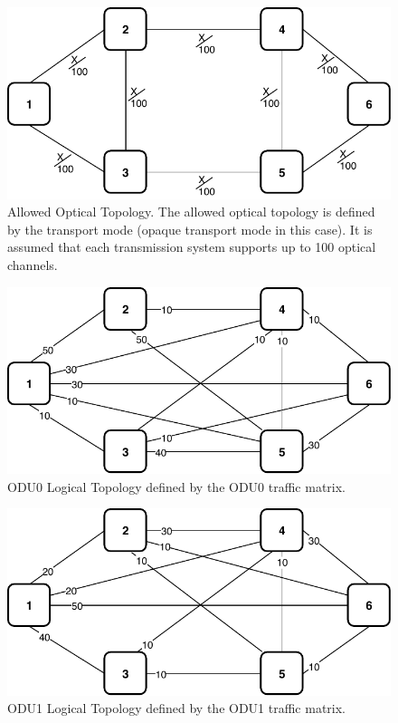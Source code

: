 \begin{figure}[h!]
\centering
\includegraphics[width=13cm]{sdf/ilp/opaque_protection/figures/allowed_optical_topology}
\caption{Allowed Optical Topology. The allowed optical topology is defined by the transport mode (opaque transport mode in this case). It is assumed that each transmission system supports up to 100 optical channels.}
\label{allowed_optical_protectionmedium}
\end{figure}

\newpage
\begin{figure}[h!]
\centering
\includegraphics[width=12cm]{sdf/ilp/opaque_protection/figures/logical_topology_ODU0_medium}
\caption{ODU0 Logical Topology defined by the ODU0 traffic matrix.}
\label{logical_ODU0_protectionmedium}
\end{figure}

\begin{figure}[h!]
\centering
\includegraphics[width=12cm]{sdf/ilp/opaque_protection/figures/logical_topology_ODU1_medium}
\caption{ODU1 Logical Topology defined by the ODU1 traffic matrix.}
\label{logical_ODU1_protectionmedium}
\end{figure}

